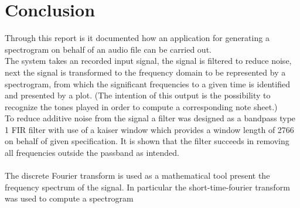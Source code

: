 \chapter{Conclusion}
Through this report is it documented how an application for generating a spectrogram on behalf of an audio file can be carried out.\\
The system takes an recorded input signal, the signal is filtered to reduce noise, next the signal is transformed to the frequency domain to be represented by a spectrogram, from which the significant frequencies to a given time is identified and presented by a plot. (The intention of this output is the possibility to recognize the tones played in order to compute a corresponding note sheet.)\\
To reduce additive noise from the signal a  filter was designed as a bandpass type 1 FIR filter with use of a kaiser window which provides a window length of 2766 on behalf of given specification. It is shown that the filter succeeds in removing all frequencies outside the passband as intended.\\
\\
The discrete Fourier transform is used as a mathematical tool present the frequency spectrum of the signal. In particular the short-time-fourier transform was used to compute a spectrogram   
 